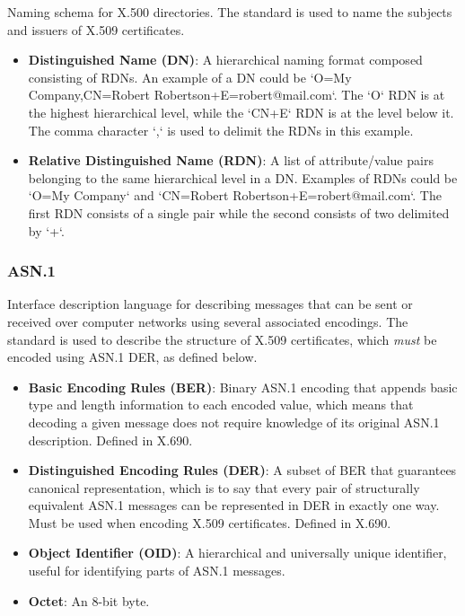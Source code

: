 Naming schema for X.500 directories.
The standard is used to name the subjects and issuers of X.509 certificates.

\begin{itemize}
\item \textbf{Distinguished Name (DN)}: A hierarchical naming format composed consisting of RDNs. An example of a DN could be `O=My Company,CN=Robert Robertson+E=robert@mail.com`. The `O` RDN is at the highest hierarchical level, while the `CN+E` RDN is at the level below it. The comma character `,` is used to delimit the RDNs in this example.
\item \textbf{Relative Distinguished Name (RDN)}: A list of attribute/value pairs belonging to the same hierarchical level in a DN. Examples of RDNs could be `O=My Company` and `CN=Robert Robertson+E=robert@mail.com`. The first RDN consists of a single pair while the second consists of two delimited by `+`.
\end{itemize}

\subsubsection{ASN.1}

Interface description language for describing messages that can be sent or received over computer networks using several associated encodings.
The standard is used to describe the structure of X.509 certificates, which \textit{must} be encoded using ASN.1 DER, as defined below.

\begin{itemize}
\item \textbf{Basic Encoding Rules (BER)}: Binary ASN.1 encoding that appends basic type and length information to each encoded value, which means that decoding a given message does not require knowledge of its original ASN.1 description. Defined in X.690.
\item \textbf{Distinguished Encoding Rules (DER)}: A subset of BER that guarantees canonical representation, which is to say that every pair of structurally equivalent ASN.1 messages can be represented in DER in exactly one way. Must be used when encoding X.509 certificates. Defined in X.690.
\item \textbf{Object Identifier (OID)}: A hierarchical and universally unique identifier, useful for identifying parts of ASN.1 messages.
\item \textbf{Octet}: An 8-bit byte.
\end{itemize}

